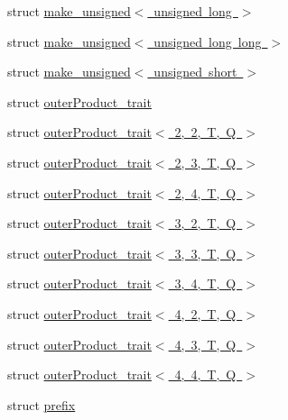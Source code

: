 \begin{DoxyCompactItemize}
\item 
struct \mbox{\hyperlink{structglm_1_1detail_1_1make__unsigned_3_01unsigned_01long_01_4}{make\+\_\+unsigned$<$ unsigned long $>$}}
\item 
struct \mbox{\hyperlink{structglm_1_1detail_1_1make__unsigned_3_01unsigned_01long_01long_01_4}{make\+\_\+unsigned$<$ unsigned long long $>$}}
\item 
struct \mbox{\hyperlink{structglm_1_1detail_1_1make__unsigned_3_01unsigned_01short_01_4}{make\+\_\+unsigned$<$ unsigned short $>$}}
\item 
struct \mbox{\hyperlink{structglm_1_1detail_1_1outer_product__trait}{outer\+Product\+\_\+trait}}
\item 
struct \mbox{\hyperlink{structglm_1_1detail_1_1outer_product__trait_3_012_00_012_00_01_t_00_01_q_01_4}{outer\+Product\+\_\+trait$<$ 2, 2, T, Q $>$}}
\item 
struct \mbox{\hyperlink{structglm_1_1detail_1_1outer_product__trait_3_012_00_013_00_01_t_00_01_q_01_4}{outer\+Product\+\_\+trait$<$ 2, 3, T, Q $>$}}
\item 
struct \mbox{\hyperlink{structglm_1_1detail_1_1outer_product__trait_3_012_00_014_00_01_t_00_01_q_01_4}{outer\+Product\+\_\+trait$<$ 2, 4, T, Q $>$}}
\item 
struct \mbox{\hyperlink{structglm_1_1detail_1_1outer_product__trait_3_013_00_012_00_01_t_00_01_q_01_4}{outer\+Product\+\_\+trait$<$ 3, 2, T, Q $>$}}
\item 
struct \mbox{\hyperlink{structglm_1_1detail_1_1outer_product__trait_3_013_00_013_00_01_t_00_01_q_01_4}{outer\+Product\+\_\+trait$<$ 3, 3, T, Q $>$}}
\item 
struct \mbox{\hyperlink{structglm_1_1detail_1_1outer_product__trait_3_013_00_014_00_01_t_00_01_q_01_4}{outer\+Product\+\_\+trait$<$ 3, 4, T, Q $>$}}
\item 
struct \mbox{\hyperlink{structglm_1_1detail_1_1outer_product__trait_3_014_00_012_00_01_t_00_01_q_01_4}{outer\+Product\+\_\+trait$<$ 4, 2, T, Q $>$}}
\item 
struct \mbox{\hyperlink{structglm_1_1detail_1_1outer_product__trait_3_014_00_013_00_01_t_00_01_q_01_4}{outer\+Product\+\_\+trait$<$ 4, 3, T, Q $>$}}
\item 
struct \mbox{\hyperlink{structglm_1_1detail_1_1outer_product__trait_3_014_00_014_00_01_t_00_01_q_01_4}{outer\+Product\+\_\+trait$<$ 4, 4, T, Q $>$}}
\item 
struct \mbox{\hyperlink{structglm_1_1detail_1_1prefix}{prefix}}
\item 

\end{DoxyCompactItemize}
